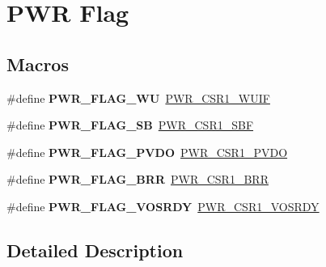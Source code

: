 \hypertarget{group___p_w_r___flag}{}\section{P\+WR Flag}
\label{group___p_w_r___flag}
\subsection*{Macros}
\begin{DoxyCompactItemize}
\item 
\mbox{\label{group___p_w_r___flag_ga2d06760a5769e729b06d41e37036d58e}} 
\#define {\bfseries P\+W\+R\+\_\+\+F\+L\+A\+G\+\_\+\+WU}~\mbox{\hyperlink{group___peripheral___registers___bits___definition_gacadb3674bdab2b1251940a0df086f51f}{P\+W\+R\+\_\+\+C\+S\+R1\+\_\+\+W\+U\+IF}}
\item 
\mbox{\label{group___p_w_r___flag_ga9e55f0b5dec2346d5c8dee3ab3c0c2df}} 
\#define {\bfseries P\+W\+R\+\_\+\+F\+L\+A\+G\+\_\+\+SB}~\mbox{\hyperlink{group___peripheral___registers___bits___definition_gab880a9892c2b1a88de26232503c8f94f}{P\+W\+R\+\_\+\+C\+S\+R1\+\_\+\+S\+BF}}
\item 
\mbox{\label{group___p_w_r___flag_gaefd05d58cc050eeef83a1b5c520b2c2a}} 
\#define {\bfseries P\+W\+R\+\_\+\+F\+L\+A\+G\+\_\+\+P\+V\+DO}~\mbox{\hyperlink{group___peripheral___registers___bits___definition_gaf3e9a5812547f32576265e00802de3d0}{P\+W\+R\+\_\+\+C\+S\+R1\+\_\+\+P\+V\+DO}}
\item 
\mbox{\label{group___p_w_r___flag_ga4d4937c0a493bc2ff70e7e66c301c191}} 
\#define {\bfseries P\+W\+R\+\_\+\+F\+L\+A\+G\+\_\+\+B\+RR}~\mbox{\hyperlink{group___peripheral___registers___bits___definition_ga917228a807ef4ab126e5b185fd2bd169}{P\+W\+R\+\_\+\+C\+S\+R1\+\_\+\+B\+RR}}
\item 
\mbox{\label{group___p_w_r___flag_ga7c0f807d7e91750a9bb571ca94dc5f71}} 
\#define {\bfseries P\+W\+R\+\_\+\+F\+L\+A\+G\+\_\+\+V\+O\+S\+R\+DY}~\mbox{\hyperlink{group___peripheral___registers___bits___definition_ga8d6257579bf96da986e5491d2621470e}{P\+W\+R\+\_\+\+C\+S\+R1\+\_\+\+V\+O\+S\+R\+DY}}
\end{DoxyCompactItemize}


\subsection{Detailed Description}
